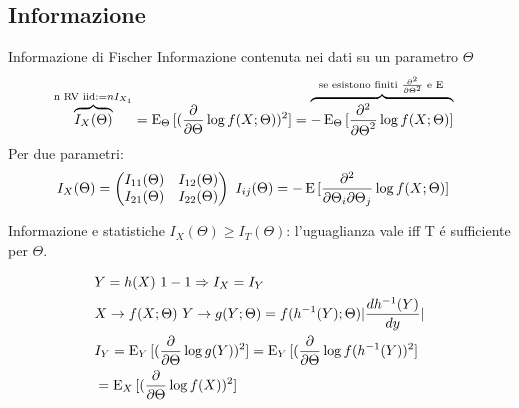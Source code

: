 \subsection{Informazione}

\begin{frame}{Informazione di Fischer}
Informazione contenuta nei dati su un parametro $\Theta$
\begin{align*}
&\overbrace{I_X(\Theta)}^{\text{n RV iid:}=nI_{X_1}}=\E_{\Theta}{[(\PDof{\Theta}\log{f(X;\Theta}))^2]}=\overbrace{-\E_{\Theta}{[\PtwoDof{\Theta}\log{f(X;\Theta)}]}}^{\text{se esistono finiti $\PtwoDof{\Theta}$ e $\E{}$}}
\end{align*}
Per due parametri:
\begin{align*}
&I_X(\Theta)=\begin{pmatrix}I_{11}(\Theta)&I_{12}(\Theta)\\I_{21}(\Theta)&I_{22}(\Theta)\end{pmatrix}\ I_{ij}(\Theta)=-\E{[\frac{\partial^2}{\partial\Theta_i\partial\Theta_j}\log{f(X;\Theta)}]}
\end{align*}
\begin{block}{Informazione e statistiche}
$I_X(\Theta)\geq I_T(\Theta)$: l'uguaglianza vale iff T \'e sufficiente per $\Theta$.
\end{block}
\begin{align*}
&Y=h(X)\ 1-1 \Rightarrow I_X=I_Y\\
&X\to f(X;\Theta)\ Y\to g(Y;\Theta)=f(\invers{h}(Y);\Theta)|\TDy{y}{\invers{h}(Y)}|\\
&I_Y=\E_Y{[(\PDof{\Theta}\log{g(Y)})^2]}=\E_Y{[(\PDof{\Theta}\log{f(\invers{h}(Y)})^2]}\\
&=\E_X{[(\PDof{\Theta}\log{f(X)})^2]}
\end{align*}
\end{frame}


